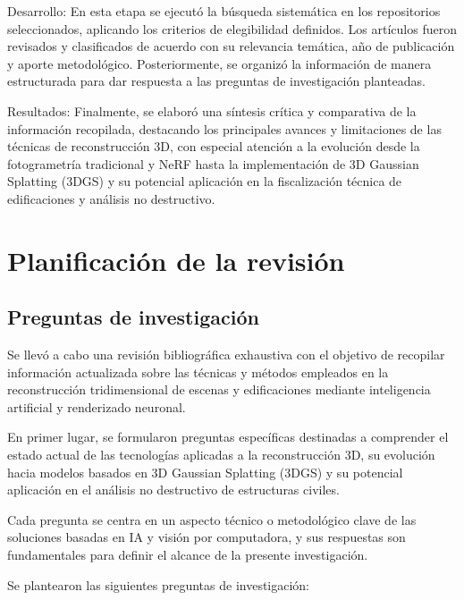 \documentclass[12pt,oneside]{report}
\begin{document}
Desarrollo: En esta etapa se ejecutó la búsqueda sistemática en los repositorios seleccionados, aplicando los criterios de elegibilidad definidos. Los artículos fueron revisados y clasificados de acuerdo con su relevancia temática, año de publicación y aporte metodológico. Posteriormente, se organizó la información de manera estructurada para dar respuesta a las preguntas de investigación planteadas.\par

Resultados: Finalmente, se elaboró una síntesis crítica y comparativa de la información recopilada, destacando los principales avances y limitaciones de las técnicas de reconstrucción 3D, con especial atención a la evolución desde la fotogrametría tradicional y NeRF hasta la implementación de 3D Gaussian Splatting (3DGS) y su potencial aplicación en la fiscalización técnica de edificaciones y análisis no destructivo.\par


\section{Planificación de la revisión}

\subsection{Preguntas de investigación}
Se llevó a cabo una revisión bibliográfica exhaustiva con el objetivo de recopilar información actualizada sobre las técnicas y métodos empleados en la reconstrucción tridimensional de escenas y edificaciones mediante inteligencia artificial y renderizado neuronal.\par

En primer lugar, se formularon preguntas específicas destinadas a comprender el estado actual de las tecnologías aplicadas a la reconstrucción 3D, su evolución hacia modelos basados en 3D Gaussian Splatting (3DGS) y su potencial aplicación en el análisis no destructivo de estructuras civiles.\par

Cada pregunta se centra en un aspecto técnico o metodológico clave de las soluciones basadas en IA y visión por computadora, y sus respuestas son fundamentales para definir el alcance de la presente investigación.\par

Se plantearon las siguientes preguntas de investigación:\par
\end{document}
